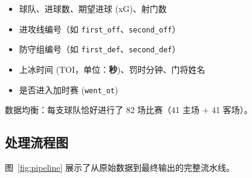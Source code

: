 \documentclass[11pt, a4paper]{article}
\begin{document}
\begin{itemize}[nosep]
    \item 球队、进球数、期望进球 (xG)、射门数
    \item 进攻线编号（如 \texttt{first\_off}、\texttt{second\_off}）
    \item 防守组编号（如 \texttt{first\_def}、\texttt{second\_def}）
    \item 上冰时间 (TOI，单位：\textbf{秒})、罚时分钟、门将姓名
    \item 是否进入加时赛 (\texttt{went\_ot})
\end{itemize}

\noindent 数据均衡：每支球队恰好进行了 82 场比赛（41 主场 + 41 客场）。

\subsection{处理流程图}

图~\ref{fig:pipeline} 展示了从原始数据到最终输出的完整流水线。
\end{document}

